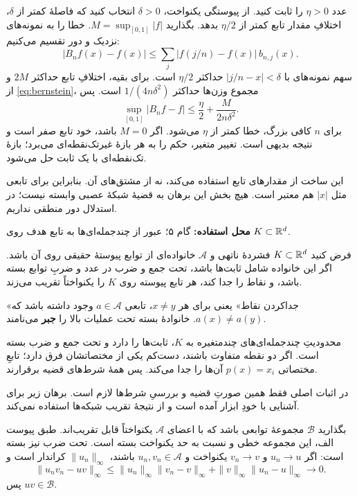 عدد $\eta>0$ را ثابت کنید. از پیوستگی یکنواخت، $\delta>0$ انتخاب کنید که فاصلهٔ کمتر از $\delta$، اختلافِ مقدار تابع کمتر از $\eta/2$ بدهد. بگذارید $M=\sup_{[0,1]}|f|$. خطا را به نمونه‌های نزدیک و دور تقسیم می‌کنیم:
\[
|B_nf(x)-f(x)|\leq\sum_j|f(j/n)-f(x)|\,b_{n,j}(x).
\]
سهم نمونه‌های با $|j/n-x|<\delta$ حداکثر $\eta/2$ است. برای بقیه، اختلافِ تابع حداکثر $2M$ و از \eqref{eq:bernstein}، مجموع وزن‌ها حداکثر $1/(4n\delta^2)$ است. پس
\[
\sup_{[0,1]}|B_nf-f|\leq\frac\eta2+\frac{M}{2n\delta^2}.
\]
برای $n$ کافی بزرگ، خطا کمتر از $\eta$ می‌شود. اگر $M=0$ باشد، خود تابع صفر است و نتیجه بدیهی است. تغییر متغیر، حکم را به هر بازهٔ غیرتک‌نقطه‌ای می‌برد؛ بازهٔ تک‌نقطه‌ای با یک ثابت حل می‌شود.

\begin{intuition}
این ساخت از مقدارهای تابع استفاده می‌کند، نه از مشتق‌های آن. بنابراین برای تابعی مثل $|x|$ هم معتبر است. هیچ بخش این برهان به قضیهٔ شبکهٔ عصبی وابسته نیست؛ در استدلال دور منطقی نداریم.
\end{intuition}

\textbf{محل استفاده:} گام ۵؛ عبور از چندجمله‌ای‌ها به تابع هدف روی $K\subset\mathbb R^d$.

فرض کنید $K\subset\mathbb R^d$ فشردهٔ ناتهی و $\mathcal A$ خانواده‌ای از توابع پیوستهٔ حقیقی روی آن باشد. اگر این خانواده شامل ثابت‌ها باشد، تحت جمع و ضرب در عدد و ضربِ توابع بسته باشد، و نقاط را جدا کند، هر تابع پیوسته روی $K$ را یکنواختاً تقریب می‌زند.

«جداکردن نقاط» یعنی برای هر $x\neq y$، تابعی $a\in\mathcal A$ وجود داشته باشد که $a(x)\neq a(y)$. خانوادهٔ بسته تحت عملیات بالا را \textbf{جبر} می‌نامند.

محدودیتِ چندجمله‌ای‌های چندمتغیره به $K$، ثابت‌ها را دارد و تحت جمع و ضرب بسته است. اگر دو نقطه متفاوت باشند، دست‌کم یکی از مختصاتشان فرق دارد؛ تابعِ مختصاتی $p(x)=x_i$ آن‌ها را جدا می‌کند. پس همهٔ شرط‌های قضیه برقرارند.

\begin{intuition}
در اثبات اصلی فقط همین صورتِ قضیه و بررسیِ شرط‌ها لازم است. برهان زیر برای آشنایی با خودِ ابزار آمده است و از نتیجهٔ تقریب شبکه‌ها استفاده نمی‌کند.
\end{intuition}

بگذارید $\mathcal B$ مجموعهٔ توابعی باشد که با اعضای $\mathcal A$ یکنواختاً قابل تقریب‌اند. طبق پیوست الف، این مجموعه خطی و نسبت به حد یکنواخت بسته است. تحت ضرب نیز بسته است: اگر $u_n\to u$ و $v_n\to v$ یکنواخت و $u_n,v_n\in\mathcal A$ باشند، $\|u_n\|_\infty$ کراندار است و
\[
\|u_nv_n-uv\|_\infty
\leq\|u_n\|_\infty\|v_n-v\|_\infty+
\|v\|_\infty\|u_n-u\|_\infty\longrightarrow0.
\]
پس $uv\in\mathcal B$.

